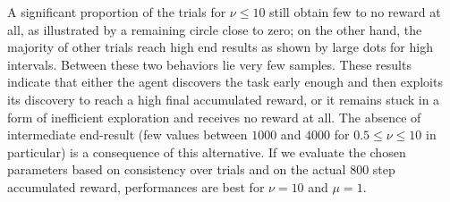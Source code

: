 \documentclass[letterpaper, 10 pt, conference]{ieeeconf}  %
\begin{document}
A significant proportion of the trials for $\nu\leq10$ still obtain few to no reward at all, as illustrated by a remaining circle close to zero; on the other hand, the majority of other trials reach high end results as shown by large dots for high intervals. Between these two behaviors lie very few samples. These results indicate that either the agent discovers the task early enough and then exploits its discovery to reach a high final accumulated reward, or it remains stuck in a form of inefficient exploration and receives no reward at all. The absence of intermediate end-result (few values between $1000$ and $4000$ for $0.5 \leq\nu\leq 10$ in particular) is a consequence of this alternative. If we evaluate the chosen parameters based on consistency over trials and on the actual 800 step accumulated reward, performances are best for $\nu=10$ and $\mu=1$.


\end{document}
